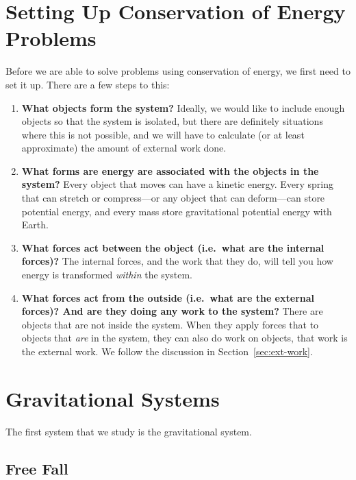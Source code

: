\section{Setting Up Conservation of Energy Problems}
Before we are able to solve problems using conservation of energy, we first
need to set it up. There are a few steps to this:
\begin{enumerate}[itemsep=6pt]
\item\textbf{What objects form the system?} Ideally, we would like to include
  enough objects so that the system is isolated, but there are definitely
  situations where this is not possible, and we will have to calculate (or at
  least approximate) the amount of external work done.

\item\textbf{What forms are energy are associated with the objects in the
  system?} Every object that moves can have a kinetic energy. Every spring that
  can stretch or compress---or any object that can deform---can store potential
  energy, and every mass store gravitational potential energy with Earth.
  
\item\textbf{What forces act between the object (i.e.\ what are the internal
  forces)?} The internal forces, and the work that they do, will tell you how
  energy is transformed \emph{within} the system.
  
\item\textbf{What forces act from the outside (i.e.\ what are the external
  forces)? And are they doing any work to the system?} There are objects that
  are not inside the system. When they apply forces that to objects that
  \emph{are} in the system, they can also do work on objects, that work is the
  external work. We follow the discussion in Section~\ref{sec:ext-work}.
\end{enumerate}



\section{Gravitational Systems}

The first system that we study is the gravitational system.

\subsection{Free Fall}

